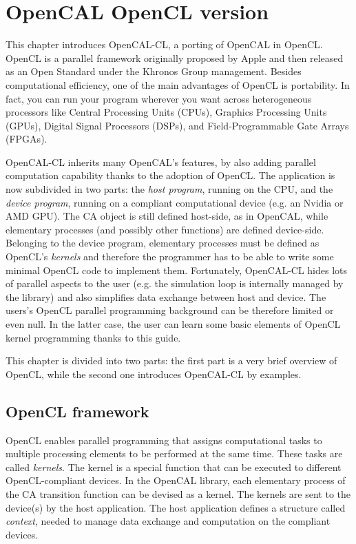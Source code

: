 \chapter{OpenCAL OpenCL version}\label{ch:opencal-cl}


This chapter introduces OpenCAL-CL, a porting of OpenCAL in
OpenCL. OpenCL is a parallel framework originally proposed by Apple
and then released as an Open Standard under the Khronos Group
management. Besides computational efficiency, one of the main
advantages of OpenCL is portability. In fact, you can run your program
wherever you want across heterogeneous processors like Central
Processing Units (CPUs), Graphics Processing Units (GPUs), Digital
Signal Processors (DSPs), and Field-Programmable Gate Arrays (FPGAs).

OpenCAL-CL inherits many OpenCAL's features, by also adding parallel
computation capability thanks to the adoption of OpenCL. The
application is now subdivided in two parts: the \emph{host program},
running on the CPU, and the \emph{device program}, running on a
compliant computational device (e.g. an Nvidia or AMD GPU). The CA
object is still defined host-side, as in OpenCAL, while elementary
processes (and possibly other functions) are defined
device-side. Belonging to the device program, elementary processes
must be defined as OpenCL's \emph{kernels} and therefore the
programmer has to be able to write some minimal OpenCL code to
implement them. Fortunately, OpenCAL-CL hides lots of parallel aspects
to the user (e.g. the simulation loop is internally managed by the
library) and also simplifies data exchange between host and
device. The users's OpenCL parallel programming background can be
therefore limited or even null. In the latter case, the user can learn
some basic elements of OpenCL kernel programming thanks to this guide.

This chapter is divided into two parts: the first part is a very brief
overview of OpenCL, while the second one introduces OpenCAL-CL by
examples.

\section{OpenCL framework}\label{sec:openclstructure}
OpenCL enables parallel programming that assigns computational tasks
to multiple processing elements to be performed at the same
time. These tasks are called \emph{kernels}. The kernel is a special
function that can be executed to different OpenCL-compliant
devices. In the OpenCAL library, each elementary process of the CA
transition function can be devised as a kernel.  The kernels are sent
to the device(s) by the host application. The host application defines
a structure called \emph{context}, needed to manage data exchange and
computation on the compliant devices.

